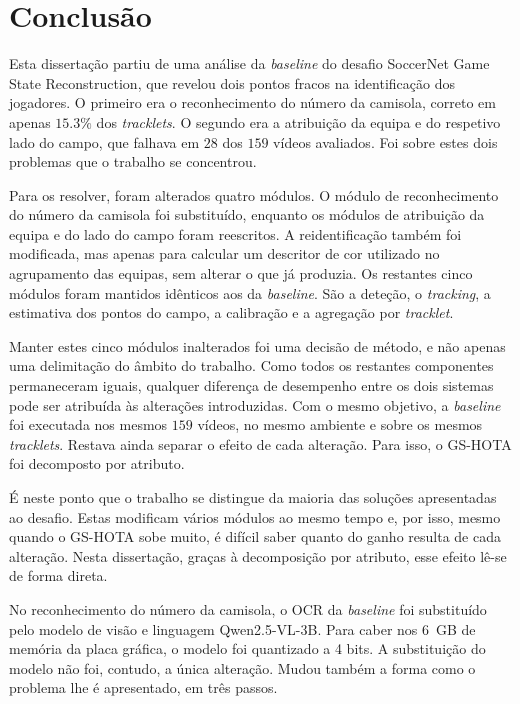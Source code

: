 \chapter{Conclusão}\label{cap:conclusao}

Esta dissertação partiu de uma análise da \emph{baseline} do desafio SoccerNet Game State Reconstruction, que revelou dois pontos fracos na identificação dos jogadores. O primeiro era o reconhecimento do número da camisola, correto em apenas $15.3\%$ dos \emph{tracklets}. O segundo era a atribuição da equipa e do respetivo lado do campo, que falhava em $28$ dos $159$ vídeos avaliados. Foi sobre estes dois problemas que o trabalho se concentrou.

Para os resolver, foram alterados quatro módulos. O módulo de reconhecimento do número da camisola foi substituído, enquanto os módulos de atribuição da equipa e do lado do campo foram reescritos. A reidentificação também foi modificada, mas apenas para calcular um descritor de cor utilizado no agrupamento das equipas, sem alterar o que já produzia. Os restantes cinco módulos foram mantidos idênticos aos da \emph{baseline}. São a deteção, o \emph{tracking}, a estimativa dos pontos do campo, a calibração e a agregação por \emph{tracklet}.

Manter estes cinco módulos inalterados foi uma decisão de método, e não apenas uma delimitação do âmbito do trabalho. Como todos os restantes componentes permaneceram iguais, qualquer diferença de desempenho entre os dois sistemas pode ser atribuída às alterações introduzidas. Com o mesmo objetivo, a \emph{baseline} foi executada nos mesmos $159$ vídeos, no mesmo ambiente e sobre os mesmos \emph{tracklets}. Restava ainda separar o efeito de cada alteração. Para isso, o GS-HOTA foi decomposto por atributo.

É neste ponto que o trabalho se distingue da maioria das soluções apresentadas ao desafio. Estas modificam vários módulos ao mesmo tempo e, por isso, mesmo quando o GS-HOTA sobe muito, é difícil saber quanto do ganho resulta de cada alteração. Nesta dissertação, graças à decomposição por atributo, esse efeito lê-se de forma direta.

No reconhecimento do número da camisola, o OCR da \emph{baseline} foi substituído pelo modelo de visão e linguagem Qwen2.5-VL-3B. Para caber nos 6~GB de memória da placa gráfica, o modelo foi quantizado a 4 bits. A substituição do modelo não foi, contudo, a única alteração. Mudou também a forma como o problema lhe é apresentado, em três passos.

